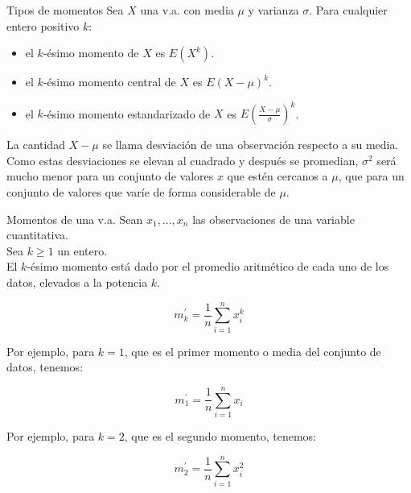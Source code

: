 \documentclass{beamer}
\begin{document}
\begin{frame}{Tipos de momentos}
Sea $X$ una v.a. con media $\mu$ y varianza $\sigma$. Para cualquier entero
positivo $k$:

\begin{itemize}
  \item el $k$-ésimo momento de $X$ es $E(X^k)$.
  \item el $k$-ésimo momento central de $X$ es $E(X-\mu)^k$.
  \item el $k$-ésimo momento estandarizado de $X$ es $E(\frac{X-\mu}{\sigma})^k$.
\end{itemize}

La cantidad $X-\mu$ se llama desviación de una observación respecto a su media.
Como estas desviaciones se elevan al cuadrado y después se promedian, $\sigma^2$
será mucho menor para un conjunto de valores $x$ que estén cercanos a $\mu$, que
para un conjunto de valores que varíe de forma considerable de $\mu$.

\end{frame}

\begin{frame}{Momentos de una v.a.}
  Sean $x_1,...,x_n$ las observaciones de una variable cuantitativa. \\
  Sea $k \geq 1$ un entero. \\
  
  El $k$-ésimo momento está dado por el promedio aritmético de cada uno de los
  datos, elevados a la potencia $k$.

  \begin{equation}
    m_{k}^{'} = \frac{1}{n} \sum_{i=1}^{n} x_{i}^{k}
  \end{equation}

  Por ejemplo, para $k=1$, que es el primer momento o media del conjunto de datos, tenemos:

  \begin{equation}
    m_{1}^{'} = \frac{1}{n} \sum_{i=1}^{n} x_{i}
  \end{equation}

  Por ejemplo, para $k=2$, que es el segundo momento, tenemos:

  \begin{equation}
    m_{2}^{'} = \frac{1}{n} \sum_{i=1}^{n} x_{i}^{2}
  \end{equation}

\end{frame}
\end{document}
